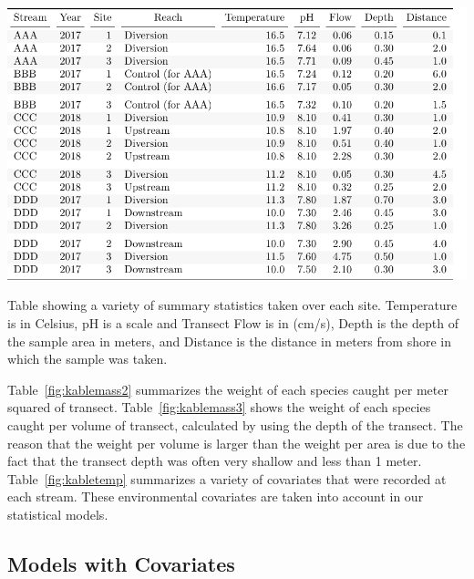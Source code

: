 


\begin{table}[H]
\includegraphics{Chapter5Images/test_update.pdf}
\caption{  \hspace{1mm}  Table showing a variety of summary statistics taken over each site. Temperature is in Celsius, pH is a scale and Transect Flow is in (cm/s), Depth is the depth of the sample area in meters, and Distance is the distance in meters from shore in which the sample was taken.}
\label{fig:kabletemp}
\end{table}

Table~\ref{fig:kablemass2} summarizes the weight of each species caught per meter squared of transect. Table~\ref{fig:kablemass3} shows the weight of each species caught per volume of transect, calculated by using the depth of the transect. The reason that the weight per volume is larger than the weight per area is due to the fact that the transect depth was often very shallow and less than 1 meter. Table~\ref{fig:kabletemp} summarizes a variety of covariates that were recorded at each stream. These environmental covariates are taken into account in our statistical models. 


\newpage

\subsection{Models with Covariates}

